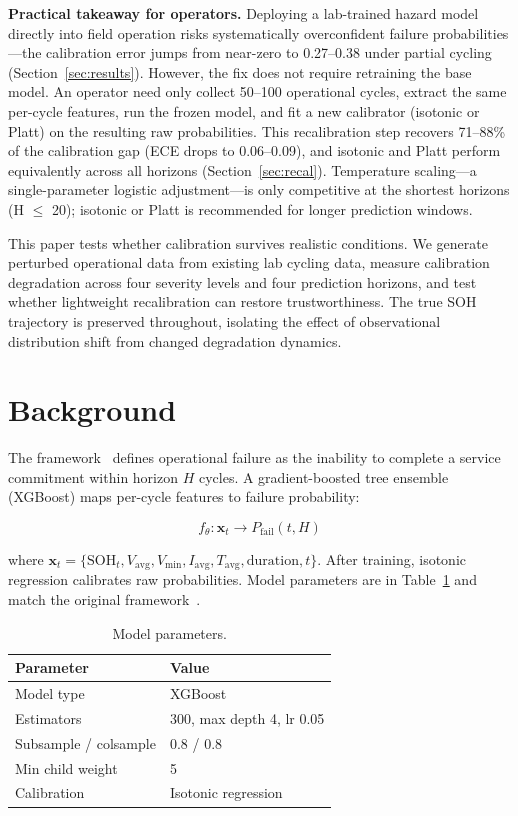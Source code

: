 \documentclass[11pt,a4paper]{article}
\begin{document}
\textbf{Practical takeaway for operators.} Deploying a lab-trained hazard model directly into field operation risks systematically overconfident failure probabilities---the calibration error jumps from near-zero to 0.27--0.38 under partial cycling (Section~\ref{sec:results}). However, the fix does not require retraining the base model. An operator need only collect 50--100 operational cycles, extract the same per-cycle features, run the frozen model, and fit a new calibrator (isotonic or Platt) on the resulting raw probabilities. This recalibration step recovers 71--88\% of the calibration gap (ECE drops to 0.06--0.09), and isotonic and Platt perform equivalently across all horizons (Section~\ref{sec:recal}). Temperature scaling---a single-parameter logistic adjustment---is only competitive at the shortest horizons (H $\leq$ 20); isotonic or Platt is recommended for longer prediction windows.

This paper tests whether calibration survives realistic conditions. We generate perturbed operational data from existing lab cycling data, measure calibration degradation across four severity levels and four prediction horizons, and test whether lightweight recalibration can restore trustworthiness. The true SOH trajectory is preserved throughout, isolating the effect of observational distribution shift from changed degradation dynamics.

\section{Background}

The framework~\cite{shikdar2026learning} defines operational failure as the inability to complete a service commitment within horizon \(H\) cycles. A gradient-boosted tree ensemble (XGBoost) maps per-cycle features to failure probability:

\[
f_\theta: \mathbf{x}_t \longrightarrow P_{\text{fail}}(t, H)
\]

where \(\mathbf{x}_t = \{\text{SOH}_t, V_{\text{avg}}, V_{\text{min}}, I_{\text{avg}}, T_{\text{avg}}, \text{duration}, t\}\). After training, isotonic regression calibrates raw probabilities. Model parameters are in Table~\ref{tab:params} and match the original framework~\cite{shikdar2026learning}.

\begin{table}[htbp]
\centering
\caption{Model parameters.}
\label{tab:params}
\begin{tabular}{@{}ll@{}}
\toprule
Parameter & Value \\
\midrule
Model type & XGBoost \\
Estimators & 300, max depth 4, lr 0.05 \\
Subsample / colsample & 0.8 / 0.8 \\
Min child weight & 5 \\
Calibration & Isotonic regression \\
\bottomrule
\end{tabular}
\end{table}
\end{document}
